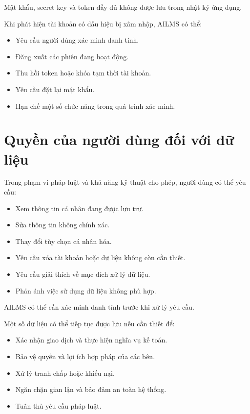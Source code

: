 \documentclass[12pt,a4paper]{article}
\begin{document}
Mật khẩu, secret key và token đầy đủ không được lưu trong nhật ký ứng dụng.

Khi phát hiện tài khoản có dấu hiệu bị xâm nhập, AILMS có thể:

\begin{itemize}
    \item Yêu cầu người dùng xác minh danh tính.
    \item Đăng xuất các phiên đang hoạt động.
    \item Thu hồi token hoặc khóa tạm thời tài khoản.
    \item Yêu cầu đặt lại mật khẩu.
    \item Hạn chế một số chức năng trong quá trình xác minh.
\end{itemize}

\section{Quyền của người dùng đối với dữ liệu}

Trong phạm vi pháp luật và khả năng kỹ thuật cho phép, người dùng có thể yêu cầu:

\begin{itemize}
    \item Xem thông tin cá nhân đang được lưu trữ.
    \item Sửa thông tin không chính xác.
    \item Thay đổi tùy chọn cá nhân hóa.
    \item Yêu cầu xóa tài khoản hoặc dữ liệu không còn cần thiết.
    \item Yêu cầu giải thích về mục đích xử lý dữ liệu.
    \item Phản ánh việc sử dụng dữ liệu không phù hợp.
\end{itemize}

AILMS có thể cần xác minh danh tính trước khi xử lý yêu cầu.

Một số dữ liệu có thể tiếp tục được lưu nếu cần thiết để:

\begin{itemize}
    \item Xác nhận giao dịch và thực hiện nghĩa vụ kế toán.
    \item Bảo vệ quyền và lợi ích hợp pháp của các bên.
    \item Xử lý tranh chấp hoặc khiếu nại.
    \item Ngăn chặn gian lận và bảo đảm an toàn hệ thống.
    \item Tuân thủ yêu cầu pháp luật.
\end{itemize}
\end{document}
